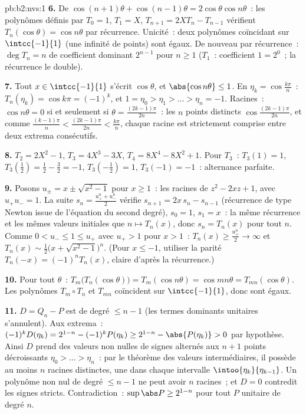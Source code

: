 \begin{solution}{pb:b2:nvs:1}
\textbf{6.} De $\cos(n{+}1)\theta + \cos(n{-}1)\theta =
2\cos\theta\cos n\theta$~: les polynômes définis par $T_0 = 1$,
$T_1 = X$, $T_{n+1} = 2XT_n - T_{n-1}$ vérifient $T_n(\cos\theta)
= \cos n\theta$ par récurrence. Unicité~: deux polynômes
coïncidant sur $\intcc{-1}{1}$ (une infinité de points) sont égaux.
De nouveau par récurrence~: $\deg T_n = n$ de coefficient dominant
$2^{n-1}$ pour $n \geq 1$ ($T_1$~: coefficient $1 = 2^0$~; la
récurrence le double).

\textbf{7.} Tout $x \in \intcc{-1}{1}$ s'écrit $\cos\theta$, et
$\abs{\cos n\theta} \leq 1$. En $\eta_k = \cos\frac{k\pi}n$~:
$T_n(\eta_k) = \cos k\pi = (-1)^k$, et $1 = \eta_0 > \eta_1 >
\dots > \eta_n = -1$. Racines~: $\cos n\theta = 0$ si et seulement si $\theta =
\frac{(2k-1)\pi}{2n}$~: les $n$ points distincts
$\cos\frac{(2k-1)\pi}{2n}$, et comme $\frac{(k-1)\pi}n <
\frac{(2k-1)\pi}{2n} < \frac{k\pi}n$, chaque racine est strictement
comprise entre deux extrema consécutifs.

\textbf{8.} $T_2 = 2X^2 - 1$, $T_3 = 4X^3 - 3X$, $T_4 = 8X^4 -
8X^2 + 1$. Pour $T_3$~: $T_3(1) = 1$, $T_3(\tfrac12) = \tfrac12 -
\tfrac32 = -1$, $T_3(-\tfrac12) = 1$, $T_3(-1) = -1$~: alternance
parfaite.

\textbf{9.} Posons $u_\pm = x \pm \sqrt{x^2 - 1}$ pour $x \geq 1$~:
les racines de $z^2 - 2xz + 1$, avec $u_+u_- = 1$. La suite
$s_n = \frac{u_+^n + u_-^n}2$ vérifie $s_{n+1} = 2x\,s_n -
s_{n-1}$ (récurrence de type Newton issue de l'équation du second
degré), $s_0 = 1$,
$s_1 = x$~: la même récurrence et les mêmes valeurs initiales que $n \mapsto
T_n(x)$, donc $s_n = T_n(x)$ pour tout $n$. Comme $0 < u_- \leq 1
\leq u_+$ avec $u_+ > 1$ pour $x > 1$~: $T_n(x) \geq
\frac{u_+^n}2 \to \infty$ et $T_n(x) \sim \frac12\bigl(x +
\sqrt{x^2-1}\bigr)^n$. (Pour $x \leq -1$, utiliser la parité $T_n(-x)
= (-1)^nT_n(x)$, claire d'après la récurrence.)

\textbf{10.} Pour tout $\theta$~: $T_m\bigl(T_n(\cos\theta)\bigr)
= T_m(\cos n\theta) = \cos mn\theta =
T_{mn}(\cos\theta)$. Les polynômes $T_m \circ T_n$ et
$T_{mn}$ coïncident sur $\intcc{-1}{1}$, donc sont égaux.

\textbf{11.} $D = Q_n - P$ est de degré $\leq n - 1$ (les termes
dominants unitaires s'annulent). Aux extrema~: $(-1)^kD(\eta_k) =
2^{1-n} - (-1)^kP(\eta_k) \geq 2^{1-n} - \abs{P(\eta_k)} > 0$ par
hypothèse. Ainsi $D$ prend des valeurs non nulles de signes alternés aux
$n + 1$ points décroissants $\eta_0 > \dots > \eta_n$~: par le
théorème des valeurs intermédiaires, il possède au moins $n$ racines
distinctes, une dans chaque intervalle  $\intoo{\eta_{k}}{\eta_{k-1}}$. Un
polynôme non nul de degré $\leq n - 1$ ne peut avoir $n$ racines~;
et $D = 0$ contredit les signes stricts. Contradiction~:
$\sup\abs P \geq 2^{1-n}$ pour tout $P$ unitaire de degré $n$.


\end{solution}
